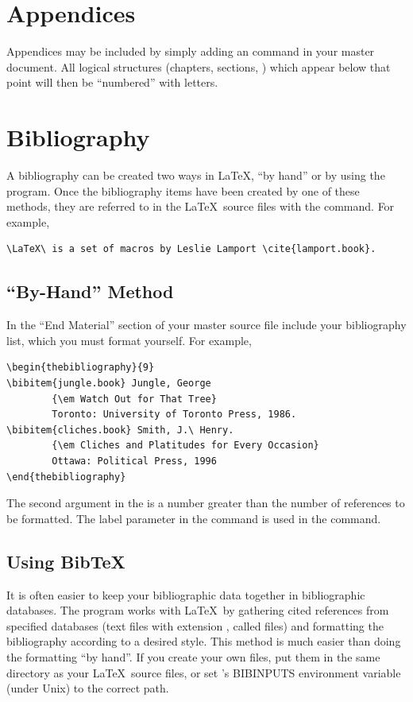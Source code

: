 \section{Appendices}
Appendices may be included by simply adding an  command in your master document.
All logical structures (chapters, sections, \etc) which appear below that point will then be ``numbered'' with letters.
\section{Bibliography}
A bibliography can be created two ways in \LaTeX , ``by hand'' or by using the  program.
Once the bibliography items have been created by one of these methods, they are referred to in the \LaTeX\ source files with the  command. 
For example,
\begin{verbatim}
\LaTeX\ is a set of macros by Leslie Lamport \cite{lamport.book}.
\end{verbatim}
\subsection{``By-Hand'' Method}
In the ``End Material'' section of your master source file include your bibliography list, which you must format yourself. 
For example,
\begin{verbatim}
\begin{thebibliography}{9}
\bibitem{jungle.book} Jungle, George 
        {\em Watch Out for That Tree}
        Toronto: University of Toronto Press, 1986.
\bibitem{cliches.book} Smith, J.\ Henry.  
        {\em Cliches and Platitudes for Every Occasion}
        Ottawa: Political Press, 1996
\end{thebibliography}
\end{verbatim}
The second argument in the  is a number greater than the number of references to be formatted.  
The label parameter in the  command is used in the  command.
\subsection{Using BibTeX}
It is often easier to keep your bibliographic data together in bibliographic databases.
The  program works with \LaTeX\ by gathering cited references from specified databases (text files with extension , called  files) and formatting the bibliography according to a desired style.
This method is much easier than doing the formatting ``by hand''.
If you create your own  files, put them in the same directory as your \LaTeX\ source files, or set 's BIBINPUTS environment variable (under Unix) to the correct path.

